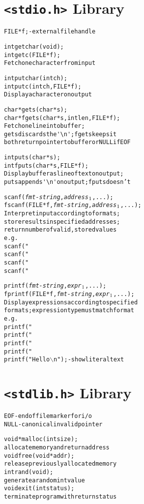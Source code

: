 \documentclass[twocolumn,12pt]{article}
\begin{document}
\section*{\texttt{<stdio.h>} Library}
\begin{alltt}
FILE *f; - \textrm{external file handle}

int getchar(void);
int getc(FILE *f);
   \textrm{Fetch one character from input}

int putchar(int ch);
int putc(int ch, FILE *f);
   \textrm{Display a character on output}

char *gets(char *s);
char *fgets(char *s, int len, FILE *f);
   \textrm{Fetch one line into buffer;}
   gets \textrm{discards the} \verb|'\n'|\textrm{;} fgets \textrm{keeps it}
   \textrm{both return pointer to buffer or} NULL \textrm{if} EOF

int puts(char *s);
int fputs(char *s, FILE *f);
   \textrm{Display buffer as line of text on output;}
   puts \textrm{appends} \verb|'\n'| \textrm{on output;} fputs \textrm{doesn't}

scanf(\emph{fmt-string}, \emph{address\(\sb{1}\)}, ...);
fscanf(FILE *f, \emph{fmt-string}, \emph{address\(\sb{1}\)}, ...);
   \textrm{Interpret input according to formats;}
   \textrm{store results in specified addresses;}
   \textrm{return number of valid, stored values}
\textrm{e.g.}
   scanf("%d", &i); - \textrm{read an integer}
   scanf("%f", &r); - \textrm{read a real number}
   scanf("%c", &c); - \textrm{read a character}
   scanf("%s", s);  - \textrm{read a string}

printf(\emph{fmt-string}, \emph{expr\(\sb{1}\)}, ...);
fprintf(FILE *f, \emph{fmt-string}, \emph{expr\(\sb{1}\)}, ...);
   \textrm{Display expressions according to specified}
   \textrm{formats; expression type must match format}
\textrm{e.g.}
   printf("%3d", i);  - \textrm{show an integer}
   printf("%.2f", r); - \textrm{show a real number}
   printf("%c", c);   - \textrm{show a character}
   printf("%s", s);    - \textrm{show a string}
   printf("Hello\(\backslash\)n");  - \textrm{show literal text}
\end{alltt}

\section*{\texttt{<stdlib.h>} Library}
\begin{alltt}
EOF  - \textrm{end of file marker for i/o}
NULL - \textrm{canonical invalid pointer}

void *malloc(int size);
   \textrm{allocate memory and return address}
void free(void *addr);
   \textrm{release previously allocated memory}
int rand(void);
   \textrm{generate a random} int \textrm{value}
void exit(int status);
   \textrm{terminate program with return status}
\end{alltt}
\end{document}
